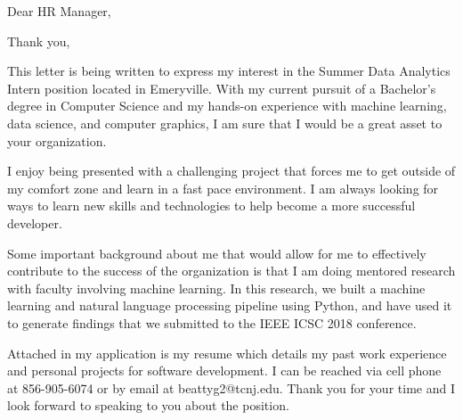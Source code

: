 \documentclass[11pt,a4paper,sans]{moderncv}        %
\begin{document}
\date{\today}
\opening{Dear HR Manager,}
\closing{Thank you,}
\makelettertitle

This letter is being written to express my interest in the Summer Data Analytics Intern position located in Emeryville.  With my current pursuit of a Bachelor's degree in Computer Science and my hands-on experience with machine learning, data science, and computer graphics, I am sure that I would be a great asset to your organization.

I enjoy being presented with a challenging project that forces me to get outside of my comfort zone and learn in a fast pace environment.  I am always looking for ways to learn new skills and technologies to help become a more successful developer.

Some important background about me that would allow for me to effectively contribute to the success of the organization is that I am doing mentored research with faculty involving machine learning. In this research, we built a machine learning and natural language processing pipeline using Python, and have used it to generate findings that we submitted to the IEEE ICSC 2018 conference.

Attached in my application is my resume which details my past work experience and personal projects for software development.  I can be reached via cell phone at 856-905-6074 or by email at beattyg2@tcnj.edu.  Thank you for your time and I look forward to speaking to you about the position.

\makeletterclosing
\end{document}
